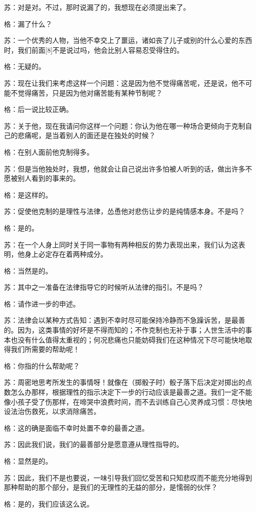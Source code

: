\documentclass[12pt,oneside]{book}
\begin{document}
苏：对是对。不过，那时说漏了的，我想现在必须提出来了。

格：漏了什么？

苏：一个优秀的人物，当他不幸交上了噩运，诸如丧了儿子或别的什么心爱的东西时，我们前面[8]不是说过吗，他会比别人容易忍受得住的。

格：无疑的。

苏：现在让我们来考虑这样一个问题：这是因为他不觉得痛苦呢，还是说，他不可能不觉得痛苦，只是因为他对痛苦能有某种节制呢？

格：后一说比较正确。

苏：关于他，现在我请问你这样一个问题：你认为他在哪一种场合更倾向于克制自己的悲痛呢，是当着别人的面还是在独处的时候？

格：在别人面前他克制得多。

苏：但是当他独处时，我想，他就会让自己说出许多怕被人听到的话，做出许多不愿被别人看到的事来的。

格：是这样的。

苏：促使他克制的是理性与法律，怂恿他对悲伤让步的是纯情感本身。不是吗？

格：是的。

苏：在一个人身上同时关于同一事物有两种相反的势力表现出来，我们认为这表明，他身上必定存在着两种成分。

格：当然是的。

苏：其中之一准备在法律指导它的时候听从法律的指引。不是吗？

格：请作进一步的申述。

苏：法律会以某种方式告知：遇到不幸时尽可能保持冷静而不急躁诉苦，是最善的。因为，这类事情的好坏是不得而知的；不作克制也无补于事；人世生活中的事本也没有什么值得太重视的；何况悲痛也只能妨碍我们在这种情况下尽可能快地取得我们所需要的帮助呢！

格：你指的什么帮助呢？

苏：周密地思考所发生的事情呀！就像在（掷骰子时）骰子落下后决定对掷出的点数怎么办那样，根据理性的指示决定下一步的行动应该是最善之道。我们一定不能像小孩子受了伤那样，在啼哭中浪费时间，而不去训练自己心灵养成习惯：尽快地设法治伤救死，以求消除痛苦。

格：这的确是面临不幸时处置不幸的最善之道。

苏：因此我们说，我们的最善部分是愿意遵从理性指导的。

格：显然是的。

苏：因此，我们不是也要说，一味引导我们回忆受苦和只知悲叹而不能充分地得到那种帮助的那个部分，是我们的无理性的无益的部分，是懦弱的伙伴？

格：是的，我们应该这么说。
\end{document}
